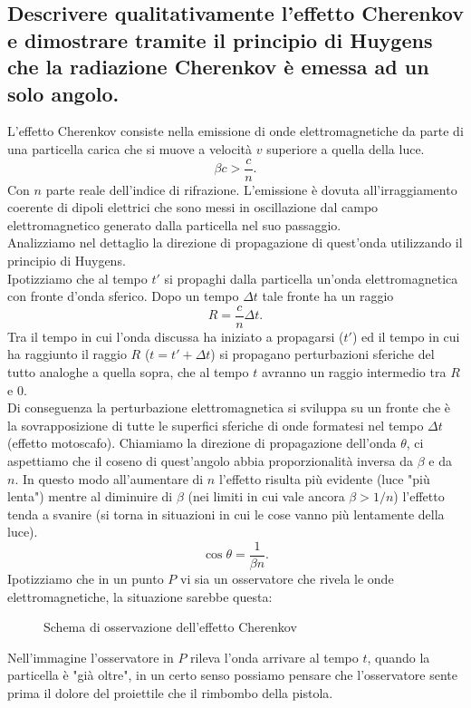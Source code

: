 \subsection[ Effetto Cherenkov e angolo Cherenkov]{Descrivere qualitativamente l’effetto Cherenkov e dimostrare tramite il principio di Huygens che la radiazione Cherenkov è emessa ad un solo angolo.
}\label{sec:4.a.6}
L'effetto Cherenkov consiste nella emissione di onde elettromagnetiche da parte di una particella carica che si muove a velocità $v$ superiore a quella della luce.
\[
	\beta c> \frac{c}{n}
.\] 
Con $n$ parte reale dell'indice di rifrazione. L'emissione è dovuta all'irraggiamento coerente di dipoli elettrici che sono messi in oscillazione dal campo elettromagnetico generato dalla particella nel suo passaggio.\\
Analizziamo nel dettaglio la direzione di propagazione di quest'onda utilizzando il principio di Huygens.\\
Ipotizziamo che al tempo $t'$ si propaghi dalla particella un'onda elettromagnetica con fronte d'onda sferico. Dopo un tempo $\Delta t$ tale fronte ha un raggio 
\[
	R = \frac{c}{n} \Delta t
.\] 
Tra il tempo in cui l'onda discussa ha iniziato a propagarsi ($t'$) ed il tempo in cui ha raggiunto il raggio $R$ ($t = t'+ \Delta t$) si propagano perturbazioni sferiche del tutto analoghe a quella sopra, che al tempo $t$ avranno un raggio intermedio tra $R$ e $0$.\\
Di conseguenza la perturbazione elettromagnetica si sviluppa su un fronte che è la sovrapposizione di tutte le superfici sferiche di onde formatesi nel tempo $\Delta t$ (effetto motoscafo).
Chiamiamo la direzione di propagazione dell'onda $\theta$, ci aspettiamo che il coseno di quest'angolo abbia proporzionalità inversa da $\beta$ e da $n$. In questo modo all'aumentare di $n$ l'effetto risulta più evidente (luce "più lenta") mentre al diminuire di $\beta$ (nei limiti in cui vale ancora $\beta > 1 /n$) l'effetto tenda a svanire (si torna in situazioni in cui le cose vanno più lentamente della luce). 
 \[
	\cos\theta = \frac{1}{\beta n}
.\] 
Ipotizziamo che in un punto $P$ vi sia un osservatore che rivela le onde elettromagnetiche, la situazione sarebbe questa:
\begin{figure}[H]
    \centering
    \caption{Schema di osservazione dell'effetto Cherenkov}
    \label{fig:cherenkov-huygens}
\end{figure}
Nell'immagine l'osservatore in $P$ rileva l'onda arrivare al tempo $t$, quando la particella è "già oltre", in un certo senso possiamo pensare che l'osservatore sente prima il dolore del proiettile che il rimbombo della pistola.\\

